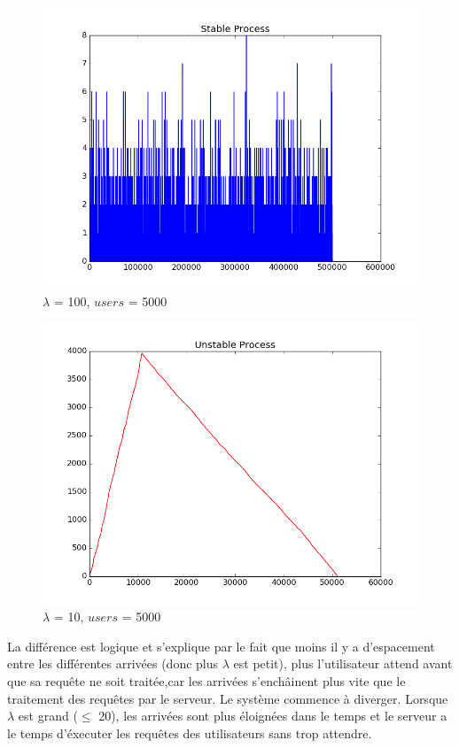\documentclass[12pt]{article}
\begin{document}
\begin{figure}[H]
\centering
\includegraphics[scale=0.50]{stableprocessquestion3.png}
\caption{\label{fig:rf_taille_noeud} $\lambda$ = 100, $users$ = 5000}
\end{figure}

\begin{figure}[H]
\centering
\includegraphics[scale=0.50]{unstableprocessquestion3.png}
\caption{\label{fig:rf_taille_noeud} $\lambda$ = 10, $users$ = 5000}
\end{figure}

La différence est logique et s'explique par le fait que moins il y a d'espacement entre les différentes arrivées (donc plus $\lambda$ est petit), plus l'utilisateur attend avant que sa requête ne soit traitée,car les arrivées s'enchâinent plus vite que le traitement des requêtes par le serveur. Le système commence à diverger. Lorsque $\lambda$ est grand ($\leq$ 20), les arrivées sont plus éloignées dans le temps et le serveur a le temps d'éxecuter les requêtes des utilisateurs sans trop attendre. 
\end{document}
